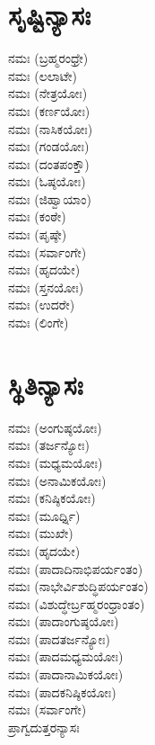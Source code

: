 \section{ಸೃಷ್ಟಿನ್ಯಾಸಃ}
 ನಮಃ (ಬ್ರಹ್ಮರಂಧ್ರೇ)\\
 ನಮಃ (ಲಲಾಟೇ)\\
 ನಮಃ (ನೇತ್ರಯೋಃ)\\
 ನಮಃ (ಕರ್ಣಯೋಃ)\\
 ನಮಃ (ನಾಸಿಕಯೋಃ)\\
 ನಮಃ (ಗಂಡಯೋಃ)\\
 ನಮಃ (ದಂತಪಂಕ್ತೌ)\\
 ನಮಃ (ಓಷ್ಠಯೋಃ)\\
 ನಮಃ (ಜಿಹ್ವಾಯಾಂ)\\
 ನಮಃ (ಕಂಠೇ)\\
 ನಮಃ (ಪೃಷ್ಠೇ)\\
 ನಮಃ (ಸರ್ವಾಂಗೇ)\\
 ನಮಃ (ಹೃದಯೇ)\\
 ನಮಃ (ಸ್ತನಯೋಃ)\\
 ನಮಃ (ಉದರೇ)\\
 ನಮಃ (ಲಿಂಗೇ)
\section{ಸ್ಥಿತಿನ್ಯಾಸಃ}
 ನಮಃ (ಅಂಗುಷ್ಠಯೋಃ)\\
 ನಮಃ (ತರ್ಜನ್ಯೋಃ)\\
 ನಮಃ (ಮಧ್ಯಮಯೋಃ)\\
 ನಮಃ (ಅನಾಮಿಕಯೋಃ)\\
 ನಮಃ (ಕನಿಷ್ಠಿಕಯೋಃ)\\
 ನಮಃ (ಮೂರ್ಧ್ನಿ)\\
 ನಮಃ (ಮುಖೇ)\\
 ನಮಃ (ಹೃದಯೇ)\\
 ನಮಃ (ಪಾದಾದಿನಾಭಿಪರ್ಯಂತಂ)\\
 ನಮಃ (ನಾಭೇರ್ವಿಶುದ್ಧಿಪರ್ಯಂತಂ)\\
 ನಮಃ (ವಿಶುದ್ಧೇರ್ಬ್ರಹ್ಮರಂಧ್ರಾಂತಂ)\\
 ನಮಃ (ಪಾದಾಂಗುಷ್ಠಯೋಃ)\\
 ನಮಃ (ಪಾದತರ್ಜನ್ಯೋಃ)\\
 ನಮಃ (ಪಾದಮಧ್ಯಮಯೋಃ)\\
 ನಮಃ (ಪಾದಾನಾಮಿಕಯೋಃ)\\
 ನಮಃ (ಪಾದಕನಿಷ್ಠಿಕಯೋಃ)\\
 ನಮಃ (ಸರ್ವಾಂಗೇ)\\
ಪ್ರಾಗ್ವದುತ್ತರನ್ಯಾಸಃ

